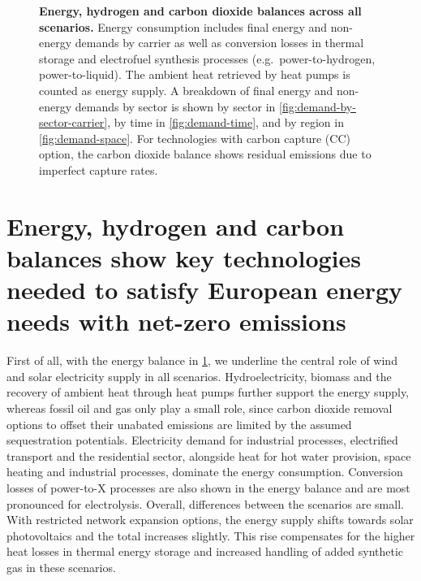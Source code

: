 
\begin{figure}
    \centering
     \caption{ {\bf Energy, hydrogen and carbon dioxide balances across all
    scenarios.} Energy consumption includes final energy and non-energy demands
    by carrier as well as conversion losses in thermal storage and electrofuel
    synthesis processes (e.g.~power-to-hydrogen, power-to-liquid). The ambient
    heat retrieved by heat pumps is counted as energy supply. A breakdown of
    final energy and non-energy demands by sector is shown by sector in
    \cref{fig:demand-by-sector-carrier}, by time in \cref{fig:demand-time}, and
    by region in \cref{fig:demand-space}. For technologies with carbon capture
    (CC) option, the carbon dioxide balance shows residual emissions due to
    imperfect capture rates. }
    \label{fig:balance}
\end{figure}

\section*{Energy, hydrogen and carbon balances show key technologies needed to satisfy European energy needs with net-zero emissions}
\label{sec:balances}

First of all, with the energy balance in \cref{fig:balance}, we underline the
central role of wind and solar electricity supply in all scenarios.
Hydroelectricity, biomass and the recovery of ambient heat through heat pumps
further support the energy supply, whereas fossil oil and gas only play a small
role, since carbon dioxide removal options to offset their unabated emissions
are limited by the assumed sequestration potentials. Electricity demand for
industrial processes, electrified transport and the residential sector,
alongside heat for hot water provision, space heating and industrial processes,
dominate the energy consumption. Conversion losses of power-to-X processes are
also shown in the energy balance and are most pronounced for electrolysis.
Overall, differences between the scenarios are small. With restricted network
expansion options, the energy supply shifts towards solar photovoltaics and the
total increases slightly. This rise compensates for the higher heat losses in
thermal energy storage and increased handling of added synthetic gas in these
scenarios.

